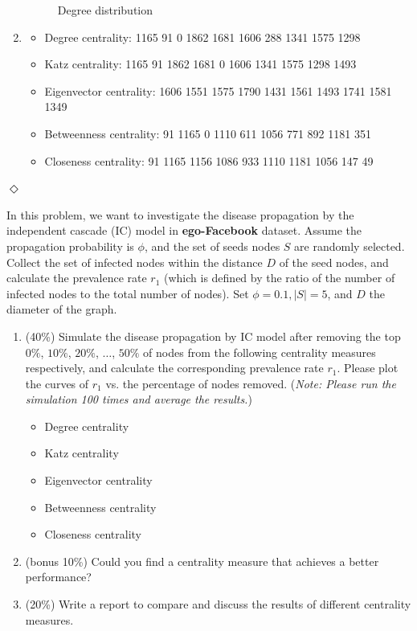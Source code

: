 \documentclass[12pt]{article}
\newcommand{\esolution}{\hfill $\Diamond$ \\ \vspace{.3cm}}
\begin{document}
\begin{enumerate}[label=(\alph*)]
\begin{figure}[h]
		\caption{Degree distribution}
		\label{degree}
	\end{figure}
	\item 
	\begin{itemize}
		\item Degree centrality: 1165 91 0 1862 1681 1606 288 1341 1575 1298
		\item Katz centrality: 1165 91 1862 1681 0 1606 1341 1575 1298 1493
		\item Eigenvector centrality: 1606 1551 1575 1790 1431 1561 1493 1741 1581 1349
		\item Betweenness centrality: 91 1165 0 1110 611 1056 771 892 1181 351
		\item Closeness centrality: 91 1165 1156 1086 933 1110 1181 1056 147 49
	\end{itemize}
\end{enumerate}
\esolution



 In this problem, we want to investigate the disease propagation by the independent cascade (IC) model in {\bf ego-Facebook} \cite{leskovec2012learning} dataset. Assume the propagation probability is $\phi$, and the set of seeds nodes $S$ are randomly selected. Collect the set of infected nodes within the distance $D$ of the seed nodes, and calculate the prevalence rate $r_1$ (which is defined by the ratio of the number of infected nodes to the total number of nodes). Set $\phi=0.1, \vert S \vert=5$, and $D$ the diameter of the graph.

\begin{enumerate}[label=(\alph*)]
	\item (40\%) Simulate the disease propagation by IC model after removing the top $0\%$, $10\%$, $20\%$, $\ldots$, $50\%$ of nodes from the following centrality measures respectively, and calculate the corresponding prevalence rate $r_1$. Please plot the curves of $r_1$ vs. the percentage of nodes removed. ({\it Note: Please run the simulation 100 times and average the results.})
	\begin{itemize}
		\item Degree centrality
		\item Katz centrality
		\item Eigenvector centrality
		\item Betweenness centrality
		\item Closeness centrality
	\end{itemize}
	\item (bonus 10\%) Could you find a centrality measure that achieves a better performance?
	\item (20\%) Write a report to compare and discuss the results of different centrality measures.  
\end{enumerate}
\end{document}
